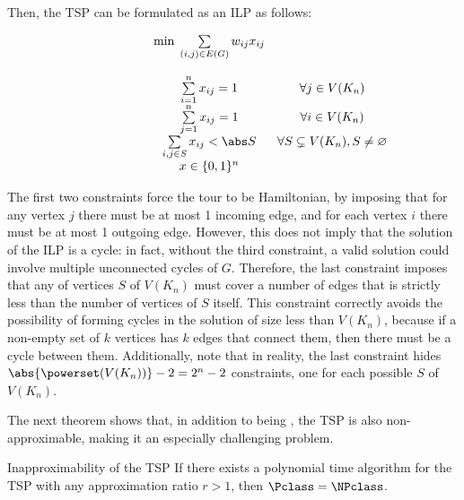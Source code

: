 \documentclass[a4paper, 12pt]{report}
\begin{document}
    Then, the TSP can be formulated as an ILP as follows:

    \[\begin{array}{ccc}
        \qquad\qquad\quad
        & \min \; \sum\limits_{(i, j) \in E(G)} {w_{ij}x_{ij}} \\\\
        & \sum\limits_{i = 1}^n {x_{ij}} = 1 & \forall j \in V(K_n) \\
        & \sum\limits_{j = 1}^n {x_{ij}} = 1 & \forall i \in V(K_n) \\
        & \sum\limits_{i, j \in S} {x_{ij}} < \abs S & \forall S \subsetneq V(K_n), S \neq \varnothing \\
        & x \in \{0,1\}^n
    \end{array}\]

    The first two constraints force the tour to be Hamiltonian, by imposing that for any vertex $j$ there must be at most 1 incoming edge, and for each vertex $i$ there must be at most 1 outgoing edge. However, this does not imply that the solution of the ILP is a cycle: in fact, without the third constraint, a valid solution could involve multiple unconnected cycles of $G$. Therefore, the last constraint imposes that any  of vertices $S$ of $V(K_n)$ must cover a number of edges that is strictly less than the number of vertices of $S$ itself. This constraint correctly avoids the possibility of forming cycles in the solution of size less than $V(K_n)$, because if a non-empty set of $k$ vertices has $k$ edges that connect them, then there must be a cycle between them. Additionally, note that in reality, the last constraint hides $\abs{\powerset(V(K_n))} - 2 = 2^n - 2$ constraints, one for each possible  $S$ of $V(K_n)$.

    The next theorem shows that, in addition to being \NPComplete, the TSP is also non-approximable, making it an especially challenging problem.

    \begin{framedthm}{Inapproximability of the TSP}
        If there exists a polynomial time algorithm for the TSP with any approximation ratio $r > 1$, then $\Pclass = \NPclass$.
    \end{framedthm}
\end{document}
